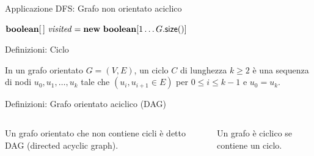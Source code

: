 \begin{frame}[shrink=10]{Applicazione DFS: Grafo non orientato aciclico}

\large
\begin{Procedure}
\caption[A]{$\BOOLEAN\ \textsf{hasCycle}(\Graph\ G)$}
$\BOOLEAN[\,]\ \mmark = \NEW\ \BOOLEAN[1 \mldots G.\textsf{size}()]$\;
\Return \FALSE\;
\end{Procedure}

\end{frame}


\begin{frame}{Definizioni: Ciclo}
	
\vspace{-6pt}
\begin{myboxtitle}
In un grafo orientato $G=(V,E)$, un \alert{ciclo} $C$ di lunghezza $k \geq 2$ è una sequenza di nodi $u_0, u_1, \ldots, u_k$ tale che $(u_i, u_{i+1} \in E)$ per $0 \leq i \leq k-1$ e $u_0 = u_k$.
\end{myboxtitle}


\end{frame}

\begin{frame}{Definizioni: Grafo orientato aciclico (DAG)}

\vspace{-6pt}
\begin{columns}[T]
\begin{myboxtitle}[DAG]
Un grafo orientato che non contiene cicli è detto \alert{DAG} (\alert{directed acyclic graph}).
\end{myboxtitle}

\bigskip
\begin{myboxtitle}
Un grafo è \alert{ciclico} se contiene un ciclo.
\end{myboxtitle}
    
\vspace{-12pt}

\end{columns}
\end{frame}

